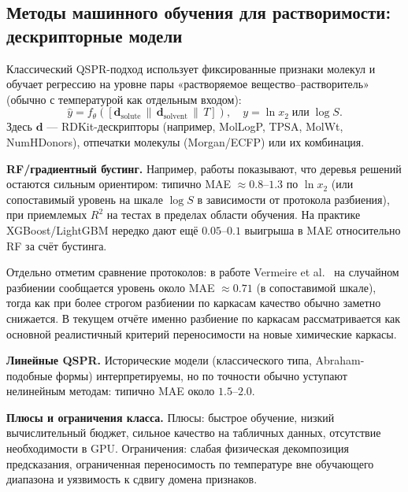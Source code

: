 \documentclass[11pt]{article}
\begin{document}
\subsection{Методы машинного обучения для растворимости: дескрипторные модели}

Классический QSPR-подход использует фиксированные признаки молекул и обучает регрессию на уровне пары «растворяемое вещество--растворитель» (обычно с температурой как отдельным входом):
\begin{equation*}
\hat{y} = f_\theta\!\left([\mathbf{d}_{\text{solute}}\,\|\,\mathbf{d}_{\text{solvent}}\,\|\,T]\right), \quad y=\ln x_2\;\text{или}\;\log S.
\end{equation*}
Здесь $\mathbf{d}$ --- RDKit-дескрипторы (например, MolLogP, TPSA, MolWt, NumHDonors), отпечатки молекулы (Morgan/ECFP) или их комбинация.

\textbf{RF/градиентный бустинг.} Например, работы \cite{lusci2013,boobier2017,vermeire2021} показывают, что деревья решений остаются сильным ориентиром: типично MAE $\approx 0.8$--$1.3$ по $\ln x_2$ (или сопоставимый уровень на шкале $\log S$ в зависимости от протокола разбиения), при приемлемых $R^2$ на тестах в пределах области обучения. На практике XGBoost/LightGBM нередко дают ещё $0.05$--$0.1$ выигрыша в MAE относительно RF за счёт бустинга.

Отдельно отметим сравнение протоколов: в работе Vermeire et al.~\cite{vermeire2021} на случайном разбиении сообщается уровень около MAE $\approx 0.71$ (в сопоставимой шкале), тогда как при более строгом разбиении по каркасам качество обычно заметно снижается. В текущем отчёте именно разбиение по каркасам рассматривается как основной реалистичный критерий переносимости на новые химические каркасы.

\textbf{Линейные QSPR.} Исторические модели (классического типа, Abraham-подобные формы) интерпретируемы, но по точности обычно уступают нелинейным методам: типично MAE около $1.5$--$2.0$.

\textbf{Плюсы и ограничения класса.} Плюсы: быстрое обучение, низкий вычислительный бюджет, сильное качество на табличных данных, отсутствие необходимости в GPU. Ограничения: слабая физическая декомпозиция предсказания, ограниченная переносимость по температуре вне обучающего диапазона и уязвимость к сдвигу домена признаков.
\end{document}
